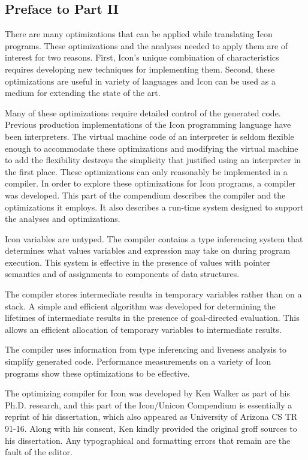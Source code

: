 \subsection{Preface to Part II}

\bigskip

There are many optimizations that can be applied while translating
Icon programs. These optimizations and the analyses needed to apply
them are of interest for two reasons. First, Icon's unique combination
of characteristics requires developing new techniques for implementing
them. Second, these optimizations are useful in variety of languages
and Icon can be used as a medium for extending the state of the art.

Many of these optimizations require detailed control of the generated
code. Previous production implementations of the Icon programming
language have been interpreters. The virtual machine code of an
interpreter is seldom flexible enough to accommodate these
optimizations and modifying the virtual machine to add the flexibility
destroys the simplicity that justified using an interpreter in the
first place. These optimizations can only reasonably be implemented in
a compiler. In order to explore these optimizations for Icon programs,
a compiler was developed. This part of the compendium describes the
compiler and the optimizations it employs. It also describes a
run-time system designed to support the analyses and optimizations.

Icon variables are untyped. The compiler contains a type inferencing
system that determines what values variables and expression may take
on during program execution. This system is effective in the presence
of values with pointer semantics and of assignments to components of
data structures.

The compiler stores intermediate results in temporary variables rather
than on a stack. A simple and efficient algorithm was developed for
determining the lifetimes of intermediate results in the presence of
goal-directed evaluation. This allows an efficient allocation of
temporary variables to intermediate results.

The compiler uses information from type inferencing and liveness
analysis to simplify generated code. Performance measurements on a
variety of Icon programs show these optimizations to be effective.

The optimizing compiler for Icon was developed by Ken Walker as part
of his Ph.D. research, and this part of the Icon/Unicon Compendium is
essentially a reprint of his dissertation, which also appeared as
University of Arizona CS TR 91-16. Along with his consent, Ken kindly
provided the original groff sources to his dissertation. Any
typographical and formatting errors that remain are the fault of the
editor.
